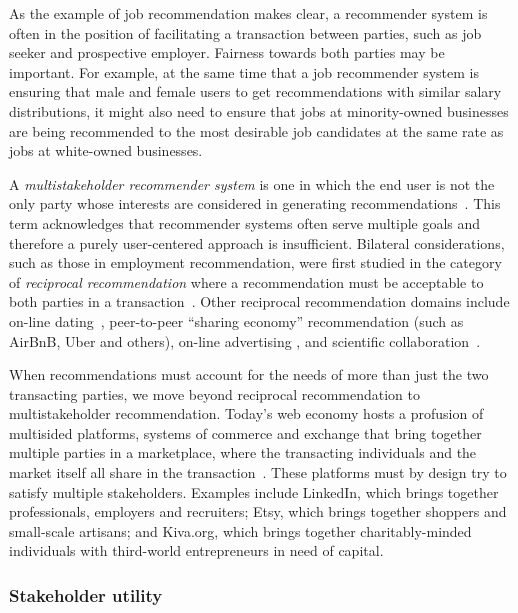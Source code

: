 As the example of job recommendation makes clear, a recommender system is often in the position of facilitating a transaction between parties, such as job seeker and prospective employer. Fairness towards both parties may be important. For example, at the same time that a job recommender system is ensuring that male and female users to get recommendations with similar salary distributions, it might also need to ensure that jobs at minority-owned businesses are being recommended to the most desirable job candidates at the same rate as jobs at white-owned businesses.

A \textit{multistakeholder recommender system} is one in which the end user is not the only party whose interests are considered in generating recommendations~\cite{soappaper,abdollahpouri_recommender_2017}. This term acknowledges that recommender systems often serve multiple goals and therefore a purely user-centered approach is insufficient. Bilateral considerations, such as those in employment recommendation, were first studied in the category of \textit{reciprocal recommendation} where a recommendation must be acceptable to both parties in a transaction~\cite{akoglu_valuepick:_2010}. Other reciprocal recommendation domains include on-line dating~\cite{reciprocal}, peer-to-peer ``sharing economy'' recommendation (such as AirBnB, Uber and others), on-line advertising \cite{targetadvertisingbiding}, and scientific collaboration~\cite{lopes2010collaboration,tang2012cross}.

When recommendations must account for the needs of more than just the two transacting parties, we move beyond reciprocal recommendation to multistakeholder recommendation. Today's web economy hosts a profusion of multisided platforms, systems of commerce and exchange that bring together multiple parties in a marketplace, where the transacting individuals and the market itself all share in the transaction~\cite{evans_matchmakers:_2016}. These platforms must by design try to satisfy multiple stakeholders. Examples include LinkedIn, which brings together professionals, employers and recruiters; Etsy, which brings together shoppers and small-scale artisans; and Kiva.org, which brings together charitably-minded individuals with third-world entrepreneurs in need of capital.

\subsubsection{Stakeholder utility}

